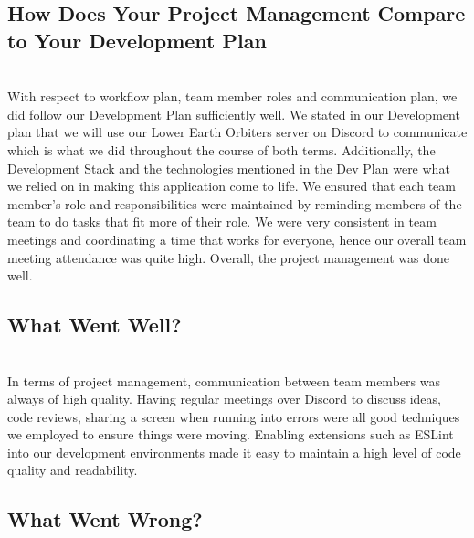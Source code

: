 \documentclass{article}
\begin{document}
\subsection{How Does Your Project Management Compare to Your Development Plan}

\\

With respect to workflow plan, team member roles and communication plan, we did follow our Development Plan sufficiently well. We stated in our Development plan that we will use our Lower Earth Orbiters server on Discord to communicate which is what we did throughout the course of both terms. Additionally, the Development Stack and the technologies mentioned in the Dev Plan were what we relied on in making this application come to life. We ensured that each team member's role and responsibilities were maintained by reminding members of the team to do tasks that fit more of their role. We were very consistent in team meetings and coordinating a time that works for everyone, hence our overall team meeting attendance was quite high. Overall, the project management was done well. 


\subsection{What Went Well?}

\\

In terms of project management, communication between team members was always of high quality. Having regular meetings over Discord to discuss ideas, code reviews, sharing a screen when running into errors were all good techniques we employed to ensure things were moving. Enabling extensions such as ESLint into our development environments made it easy to maintain a high level of code quality and readability. 




\subsection{What Went Wrong?}

\\
\end{document}
